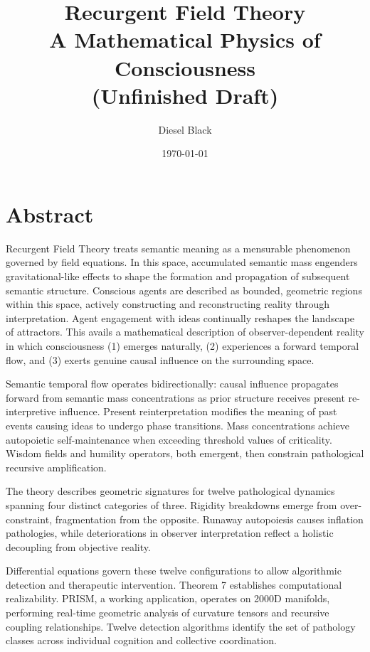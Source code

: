 \documentclass[11pt, a4paper]{report}
\title{Recurgent Field Theory \\ A Mathematical Physics of Consciousness \\ \small{(Unfinished Draft)}}
\author{Diesel Black}
\date{\today}
\begin{document}
\maketitle

\section*{Abstract}
Recurgent Field Theory treats semantic meaning as a mensurable phenomenon governed by field equations. In this space, accumulated semantic mass engenders gravitational-like effects to shape the formation and propagation of subsequent semantic structure. Conscious agents are described as bounded, geometric regions within this space, actively constructing and reconstructing reality through interpretation. Agent engagement with ideas continually reshapes the landscape of attractors. This avails a mathematical description of observer-dependent reality in which consciousness (1) emerges naturally, (2) experiences a forward temporal flow, and (3) exerts genuine causal influence on the surrounding space.

Semantic temporal flow operates bidirectionally: causal influence propagates forward from semantic mass concentrations as prior structure receives present re-interpretive influence. Present reinterpretation modifies the meaning of past events causing ideas to undergo phase transitions. Mass concentrations achieve autopoietic self-maintenance when exceeding threshold values of criticality. Wisdom fields and humility operators, both emergent, then constrain pathological recursive amplification.

The theory describes geometric signatures for twelve pathological dynamics spanning four distinct categories of three. Rigidity breakdowns emerge from over-constraint, fragmentation from the opposite. Runaway autopoiesis causes inflation pathologies, while deteriorations in observer interpretation reflect a holistic decoupling from objective reality.

Differential equations govern these twelve configurations to allow algorithmic detection and therapeutic intervention. Theorem 7 establishes computational realizability. PRISM, a working application, operates on 2000D manifolds, performing real-time geometric analysis of curvature tensors and recursive coupling relationships. Twelve detection algorithms identify the set of pathology classes across individual cognition and collective coordination.
\end{document}
